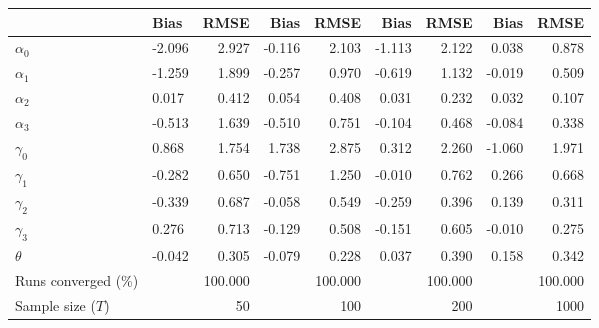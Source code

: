 
\begin{tabular}[t]{llrrrrrrr}
\toprule
  & Bias & RMSE & Bias & RMSE & Bias & RMSE & Bias & RMSE\\
\midrule
$\alpha_{0}$ & -2.096 & 2.927 & -0.116 & 2.103 & -1.113 & 2.122 & 0.038 & 0.878\\
$\alpha_{1}$ & -1.259 & 1.899 & -0.257 & 0.970 & -0.619 & 1.132 & -0.019 & 0.509\\
$\alpha_{2}$ & 0.017 & 0.412 & 0.054 & 0.408 & 0.031 & 0.232 & 0.032 & 0.107\\
$\alpha_{3}$ & -0.513 & 1.639 & -0.510 & 0.751 & -0.104 & 0.468 & -0.084 & 0.338\\
$\gamma_{0}$ & 0.868 & 1.754 & 1.738 & 2.875 & 0.312 & 2.260 & -1.060 & 1.971\\
$\gamma_{1}$ & -0.282 & 0.650 & -0.751 & 1.250 & -0.010 & 0.762 & 0.266 & 0.668\\
$\gamma_{2}$ & -0.339 & 0.687 & -0.058 & 0.549 & -0.259 & 0.396 & 0.139 & 0.311\\
$\gamma_{3}$ & 0.276 & 0.713 & -0.129 & 0.508 & -0.151 & 0.605 & -0.010 & 0.275\\
$\theta$ & -0.042 & 0.305 & -0.079 & 0.228 & 0.037 & 0.390 & 0.158 & 0.342\\
Runs converged (\%) &  & 100.000 &  & 100.000 &  & 100.000 &  & 100.000\\
Sample size ($T$) &  & 50 &  & 100 &  & 200 &  & 1000\\
\bottomrule
\end{tabular}
